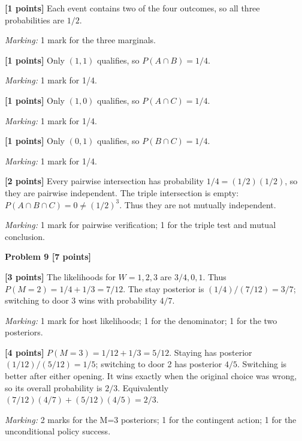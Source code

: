 \documentclass[12pt,letterpaper]{article}
\newcommand{\problemheading}[2][5\baselineskip]{\Needspace{#1}\par\noindent\hspace*{-0.625in}\textbf{#2}\par\nobreak\vspace{0.3em}}
\begin{document}
\begin{description}[font=\normalfont,leftmargin=1.2em,labelsep=0.4em]
\item[(a)] \textbf{[1 points]} Each event contains two of the four outcomes, so all three probabilities are $1/2$.
\par\textit{Marking:} 1 mark for the three marginals.
\item[(b)] \textbf{[1 points]} Only $(1,1)$ qualifies, so $P(A\cap B)=1/4$.
\par\textit{Marking:} 1 mark for 1/4.
\item[(c)] \textbf{[1 points]} Only $(1,0)$ qualifies, so $P(A\cap C)=1/4$.
\par\textit{Marking:} 1 mark for 1/4.
\item[(d)] \textbf{[1 points]} Only $(0,1)$ qualifies, so $P(B\cap C)=1/4$.
\par\textit{Marking:} 1 mark for 1/4.
\item[(e)] \textbf{[2 points]} Every pairwise intersection has probability $1/4=(1/2)(1/2)$, so they are pairwise independent. The triple intersection is empty: $P(A\cap B\cap C)=0\ne(1/2)^3$. Thus they are not mutually independent.
\par\textit{Marking:} 1 mark for pairwise verification; 1 for the triple test and mutual conclusion.
\end{description}
\vspace{0.65em}
\problemheading[\dimexpr 3\baselineskip+4\baselineskip\relax]{Problem 9 [7 points]}
\begin{description}[font=\normalfont,leftmargin=1.2em,labelsep=0.4em]
\item[(a)] \textbf{[3 points]} The likelihoods for $W=1,2,3$ are $3/4,0,1$. Thus $P(M=2)=1/4+1/3=7/12$. The stay posterior is $(1/4)/(7/12)=3/7$; switching to door 3 wins with probability $4/7$.
\par\textit{Marking:} 1 mark for host likelihoods; 1 for the denominator; 1 for the two posteriors.
\item[(b)] \textbf{[4 points]} $P(M=3)=1/12+1/3=5/12$. Staying has posterior $(1/12)/(5/12)=1/5$; switching to door 2 has posterior $4/5$. Switching is better after either opening. It wins exactly when the original choice was wrong, so its overall probability is $2/3$. Equivalently $(7/12)(4/7)+(5/12)(4/5)=2/3$.
\par\textit{Marking:} 2 marks for the M=3 posteriors; 1 for the contingent action; 1 for the unconditional policy success.
\end{description}
\end{document}
